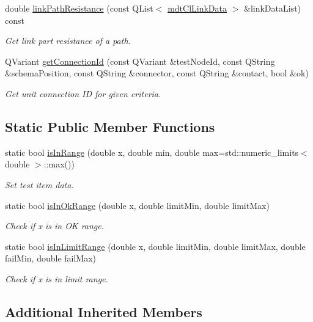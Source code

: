 \begin{DoxyCompactItemize}
double \hyperlink{classmdt_tt_test_a0a19a6295566c3b7697f3824ec458f6f}{link\-Path\-Resistance} (const Q\-List$<$ \hyperlink{classmdt_cl_link_data}{mdt\-Cl\-Link\-Data} $>$ \&link\-Data\-List) const 
\begin{DoxyCompactList}\small\item\em Get link part resistance of a path. \end{DoxyCompactList}\item 
Q\-Variant \hyperlink{classmdt_tt_test_abf39ceb44b891273851a92f84e267900}{get\-Connection\-Id} (const Q\-Variant \&test\-Node\-Id, const Q\-String \&schema\-Position, const Q\-String \&connector, const Q\-String \&contact, bool \&ok)
\begin{DoxyCompactList}\small\item\em Get unit connection I\-D for given criteria. \end{DoxyCompactList}\end{DoxyCompactItemize}
\subsection*{Static Public Member Functions}
\begin{DoxyCompactItemize}
\item 
static bool \hyperlink{classmdt_tt_test_a5920961d0f32d37033a184ed76b2cf3d}{is\-In\-Range} (double x, double min, double max=std\-::numeric\-\_\-limits$<$ double $>$\-::max())
\begin{DoxyCompactList}\small\item\em Set test item data. \end{DoxyCompactList}\item 
static bool \hyperlink{classmdt_tt_test_a62a8e5118129566aa897bba3ff079a4e}{is\-In\-Ok\-Range} (double x, double limit\-Min, double limit\-Max)
\begin{DoxyCompactList}\small\item\em Check if x is in O\-K range. \end{DoxyCompactList}\item 
static bool \hyperlink{classmdt_tt_test_a0384aea1eb7edde259888e5fecae976c}{is\-In\-Limit\-Range} (double x, double limit\-Min, double limit\-Max, double fail\-Min, double fail\-Max)
\begin{DoxyCompactList}\small\item\em Check if x is in limit range. \end{DoxyCompactList}\end{DoxyCompactItemize}
\subsection*{Additional Inherited Members}


